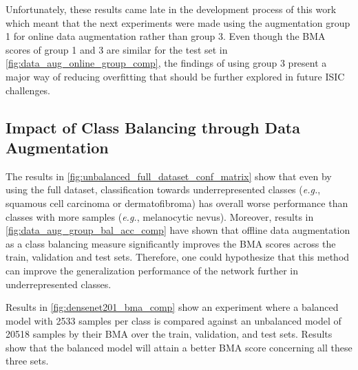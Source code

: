     Unfortunately, these results came late in the development process of this work which meant that the next experiments were made using the augmentation group 1 for online data augmentation rather than group 3. Even though the \ac{BMA} scores of group 1 and 3 are similar for the test set in \autoref{fig:data_aug_online_group_comp}, the findings of using group 3 present a major way of reducing overfitting that should be further explored in future \ac{ISIC} challenges. \par 
    
    \subsection{Impact of Class Balancing through Data Augmentation}
    \label{section:class_bal_impact}
    
    The results in \autoref{fig:unbalanced_full_dataset_conf_matrix} show that even by using the full dataset, classification towards underrepresented classes (\textit{e.g.}, squamous cell carcinoma or dermatofibroma) has overall worse performance than classes with more samples (\textit{e.g.}, melanocytic nevus). Moreover, results in \autoref{fig:data_aug_group_bal_acc_comp} have shown that offline data augmentation as a class balancing measure significantly improves the \ac{BMA} scores across the train, validation and test sets. Therefore, one could hypothesize that this method can improve the generalization performance of the network further in underrepresented classes. \par
    
    Results in \autoref{fig:densenet201_bma_comp} show an experiment where a balanced model with 2533 samples per class is compared against an unbalanced model of 20518 samples by their \ac{BMA} over the train, validation, and test sets. Results show that the balanced model will attain a better \ac{BMA} score concerning all these three sets. \par
    
